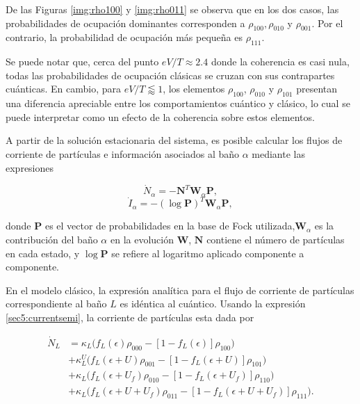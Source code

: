 De las Figuras \ref{img:rho100} y \ref{img:rho011} se observa que en los dos casos, las probabilidades de ocupación dominantes corresponden a $\rho_{100},\rho_{010}$ y $\rho_{001}$. Por el contrario, la probabilidad de ocupación más pequeña es $\rho_{111}$.
 
Se puede notar que, cerca del punto $eV/T \approx 2.4$ donde la coherencia es casi nula, todas las probabilidades de ocupación clásicas se cruzan con sus contrapartes cuánticas. En cambio, para $eV/T \lessapprox 1$, los elementos $\rho_{100}$, $\rho_{010}$ y $\rho_{101}$ presentan una diferencia apreciable entre los comportamientos cuántico y clásico, lo cual se puede interpretar como un efecto de la coherencia sobre estos elementos.


A partir de la solución estacionaria del sistema, es posible calcular los flujos de corriente de partículas e información asociados al baño $\alpha$ mediante las expresiones

\begin{equation}
    \dot{N}_{\alpha} = -\mathbf{N}^{T} \mathbf{W}_{\alpha}\mathbf{P},
    \label{sec5:currentsemi}
\end{equation}
\begin{equation}
    \dot{I}_{\alpha} = -(\log \mathbf{P})^{T} \mathbf{W}_{\alpha}\mathbf{P},
    \label{sec5:infosemi}
\end{equation}

donde $\mathbf{P}$ es el vector de probabilidades en la base de Fock utilizada,$\mathbf{W}_{\alpha}$ es la contribución del baño $\alpha$ en la evolución $\mathbf{W}$, $\mathbf{N}$ contiene el número de partículas en cada estado, y $\log \mathbf{P}$ se refiere al logaritmo aplicado componente a componente.

En el modelo clásico, la expresión analítica para el flujo de corriente de partículas correspondiente al baño $L$ es idéntica al cuántico. Usando la expresión \ref{sec5:currentsemi}, la corriente de partículas esta dada por  

\begin{align*}
    \dot{N}_{L} & = \kappa_{L}\big(f_{L}(\epsilon)\rho_{000} - [1-f_{L}(\epsilon)]\rho_{100} \big) \\
        & + \kappa^{U}_{L} \big(f_{L}(\epsilon+U)\rho_{001} - [1-f_{L}(\epsilon+U)]\rho_{101} \big)  \\
        & + \kappa_{L} \big(f_{L}(\epsilon+U_{f})\rho_{010} - [1-f_{L}(\epsilon+U_{f})]\rho_{110} \big)  \\  
        & + \kappa_{L} \big(f_{L}(\epsilon+U + U_{f})\rho_{011} - [1-f_{L}(\epsilon+U+U_{f})]\rho_{111} \big).
\end{align*}

